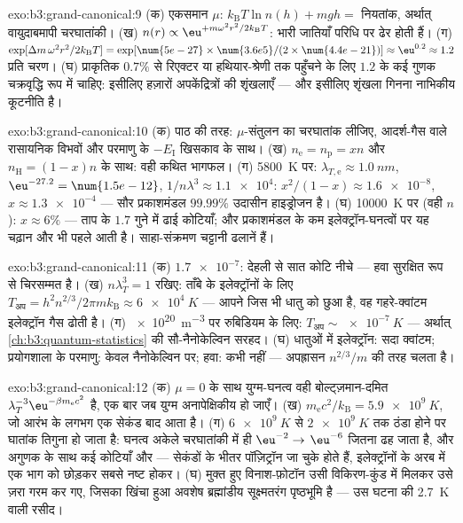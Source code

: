 \begin{solution}{exo:b3:grand-canonical:9}
(क) एकसमान $\mu$: $k_{\text{B}}T\ln n(h) + mgh = $ नियतांक, अर्थात्
वायुदाबमापी चरघातांकी। (ख) $n(r) \propto
\eu^{+m\omega^2r^2/2k_{\text{B}}T}$: भारी जातियाँ परिधि पर
ढेर होती हैं। (ग) $\exp[\Delta m\,\omega^2r^2/2k_{\text{B}}T] =
\exp[\num{5e-27} \times \num{3.6e5}/(2 \times \num{4.4e-21})]
\approx \eu^{0.2} \approx 1.2$ प्रति चरण। (घ) प्राकृतिक
$0.7\%$ से रिएक्टर या हथियार-श्रेणी तक पहुँचने के लिए
$1.2$ के कई गुणक चक्रवृद्धि रूप में चाहिए: इसीलिए हज़ारों
अपकेंद्रित्रों की शृंखलाएँ --- और इसीलिए शृंखला गिनना नाभिकीय
कूटनीति है।
\end{solution}

\begin{solution}{exo:b3:grand-canonical:10}
(क) पाठ की तरह: $\mu$-संतुलन का चरघातांक लीजिए, आदर्श-गैस वाले
रासायनिक विभवों और परमाणु के $-E_{\text{I}}$ खिसकाव के साथ। (ख)
$n_{\text{e}} = n_{\text{p}} = xn$ और $n_{\text{H}} =
(1-x)n$ के साथ: वही कथित भागफल। (ग) \qty{5800}{K} पर:
$\lambda_{T,\text{e}} \approx \qty{1.0}{nm}$,
$\eu^{-27.2} = \num{1.5e-12}$, $1/n\lambda^3 \approx \num{1.1e4}$:
$x^2/(1-x) \approx \num{1.6e-8}$, $x \approx \num{1.3e-4}$ ---
सौर प्रकाशमंडल $99.99\%$ उदासीन हाइड्रोजन है। (घ)
\qty{10000}{K} पर (वही $n$): $x \approx 6\%$ --- ताप के $1.7$ गुने
में ढाई कोटियाँ; और प्रकाशमंडल के कम इलेक्ट्रॉन-घनत्वों पर यह चढ़ान
और भी पहले आती है। साहा-संक्रमण चट्टानी ढलानें हैं।
\end{solution}

\begin{solution}{exo:b3:grand-canonical:11}
(क) $\num{1.7e-7}$: देहली से सात कोटि नीचे --- हवा
सुरक्षित रूप से चिरसम्मत है। (ख) $n\lambda_T^3 = 1$ रखिए: ताँबे के
इलेक्ट्रॉनों के लिए $T_{\text{अप}} =
h^2n^{2/3}/2\pi mk_{\text{B}} \approx \qty{6e4}{K}$
--- आपने जिस भी धातु को छुआ है, वह गहरे-क्वांटम इलेक्ट्रॉन गैस
ढोती है। (ग) \qty{e20}{m^{-3}} पर रुबिडियम के लिए:
$T_{\text{अप}} \sim \qty{e-7}{K}$ --- अर्थात्
\cref{ch:b3:quantum-statistics} की सौ-नैनोकेल्विन सरहद। (घ) धातुओं
में इलेक्ट्रॉन: सदा क्वांटम; प्रयोगशाला के परमाणु: केवल
नैनोकेल्विन पर; हवा: कभी नहीं --- अपह्रासन $n^{2/3}/m$ की तरह चलता है।
\end{solution}

\begin{solution}{exo:b3:grand-canonical:12}
(क) $\mu = 0$ के साथ युग्म-घनत्व वही बोल्ट्ज़मान-दमित
$\lambda_T^{-3}\eu^{-\beta m_{\text{e}}c^2}$ है, एक बार जब युग्म
अनापेक्षिकीय हो जाएँ। (ख) $m_{\text{e}}c^2/k_{\text{B}} =
\qty{5.9e9}{K}$, जो आरंभ के लगभग एक सेकंड बाद आता है।
(ग) $\qty{6e9}{K}$ से $\qty{2e9}{K}$ तक ठंडा होने पर
घातांक तिगुना हो जाता है: घनत्व अकेले चरघातांकी में ही $\eu^{-2} \to$
$\eu^{-6}$ जितना ढह जाता है, और अगुणक के साथ कई कोटियाँ और ---
सेकंडों के भीतर पॉज़िट्रॉन जा चुके होते हैं, इलेक्ट्रॉनों के अरब में
एक भाग को छोड़कर सबसे नष्ट होकर। (घ) मुक्त हुए
विनाश-फ़ोटॉन उसी विकिरण-कुंड में मिलकर उसे ज़रा गरम कर गए, जिसका
खिंचा हुआ अवशेष ब्रह्मांडीय सूक्ष्मतरंग पृष्ठभूमि है
--- उस घटना की \qty{2.7}{K} वाली रसीद।
\end{solution}

